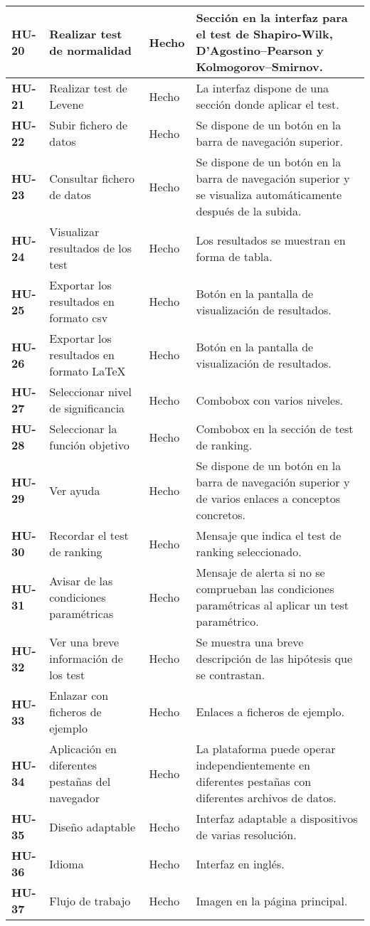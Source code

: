 \begin{center}
\begin{longtable}[H]{| p{2cm} | p{4.25cm} | p{1cm} | p{5cm} |}
	\textbf{HU-20} & Realizar test de normalidad & Hecho & Sección en la interfaz para el test de Shapiro-Wilk, D’Agostino–Pearson y Kolmogorov–Smirnov. \\ \hline
	\textbf{HU-21} & Realizar test de Levene & Hecho & La interfaz dispone de una sección donde aplicar el test. \\ \hline
	\textbf{HU-22} & Subir fichero de datos & Hecho & Se dispone de un botón en la barra de navegación superior. \\ \hline
	\textbf{HU-23} & Consultar fichero de datos & Hecho & Se dispone de un botón en la barra de navegación superior y se visualiza automáticamente después de la subida. \\ \hline
	\textbf{HU-24} & Visualizar resultados de los test & Hecho & Los resultados se muestran en forma de tabla. \\ \hline
	\textbf{HU-25} & Exportar los resultados en formato csv & Hecho & Botón en la pantalla de visualización de resultados. \\ \hline
	\textbf{HU-26} & Exportar los resultados en formato \LaTeX & Hecho & Botón en la pantalla de visualización de resultados. \\ \hline
	\textbf{HU-27} & Seleccionar nivel de significancia & Hecho & Combobox con varios niveles. \\ \hline
	\textbf{HU-28} & Seleccionar la función objetivo & Hecho & Combobox en la sección de test de ranking. \\ \hline
	\textbf{HU-29} & Ver ayuda & Hecho & Se dispone de un botón en la barra de navegación superior y de varios enlaces a conceptos concretos. \\ \hline
	\textbf{HU-30} & Recordar el test de ranking & Hecho & Mensaje que indica el test de ranking seleccionado. \\ \hline
	\textbf{HU-31} & Avisar de las condiciones paramétricas & Hecho & Mensaje de alerta si no se comprueban las condiciones paramétricas al aplicar un test paramétrico. \\ \hline
	\textbf{HU-32} & Ver una breve información de los test & Hecho & Se muestra una breve descripción de las hipótesis que se contrastan. \\ \hline
	\textbf{HU-33} & Enlazar con ficheros de ejemplo & Hecho & Enlaces a ficheros de ejemplo. \\ \hline
	\textbf{HU-34} & Aplicación en diferentes pestañas del navegador & Hecho & La plataforma puede operar independientemente en diferentes pestañas con diferentes archivos de datos. \\ \hline
	\textbf{HU-35} & Diseño adaptable & Hecho & Interfaz adaptable a dispositivos de varias resolución. \\ \hline
	\textbf{HU-36} & Idioma & Hecho & Interfaz en inglés. \\ \hline
	\textbf{HU-37} & Flujo de trabajo & Hecho & Imagen en la página principal. \\ \hline
\end{longtable}
\end{center}
